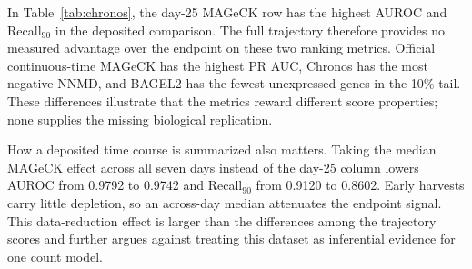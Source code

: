 In Table~\ref{tab:chronos}, the day-25 MAGeCK row has the highest AUROC and
Recall$_{90}$ in the deposited comparison.  The full trajectory therefore
provides no measured advantage over the endpoint on these two ranking metrics.
Official continuous-time MAGeCK
has the highest PR AUC, Chronos has the most negative NNMD, and BAGEL2 has the
fewest unexpressed genes in the 10\% tail.  These differences illustrate that
the metrics reward different score properties; none supplies the missing
biological replication.

How a deposited time course is summarized also matters.  Taking the median
MAGeCK effect across all seven days instead of the day-25 column lowers AUROC
from 0.9792 to 0.9742 and Recall$_{90}$ from 0.9120 to 0.8602.  Early harvests
carry little depletion, so an across-day median attenuates the endpoint signal.
This data-reduction effect is larger than the differences among the trajectory
scores and further argues against treating this dataset as inferential evidence
for one count model.
